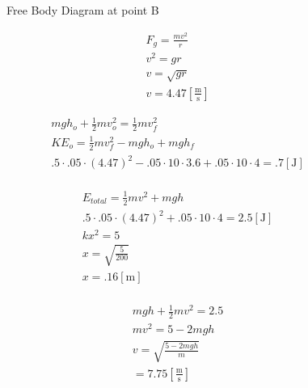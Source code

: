 \documentclass[12pt]{article}
\begin{document}
    \begin{figure}[h]
      \centering
      
      \caption{Free Body Diagram at point B}
      \label{fig:1}
    \end{figure}

    \begin{equation}
      \begin{split}
        F_g=\frac{mv^2}{r}\\
        v^2=gr\\
        v=\sqrt{gr}\\
        v=4.47\left[ \frac{\si{\meter}}{\si{\second}} \right]
      \end{split}
      \label{5}
    \end{equation}

    \begin{equation}
      \begin{split}
        mgh_o+\frac{1}{2}mv^2_o=\frac{1}{2}mv^2_f\\
        KE_o=\frac{1}{2}mv^2_f-mgh_o+mgh_f\\
      .5\cdot.05\cdot(4.47)^2-.05\cdot10\cdot3.6+.05\cdot10\cdot4=.7[\si{\joule}]\\
      \end{split}
      \label{6}
    \end{equation}

    \begin{equation}
      \begin{split}
        E_{total}=\frac{1}{2}mv^2+mgh\\
        .5\cdot.05\cdot(4.47)^2+.05\cdot10\cdot4=2.5\left[  \si{\joule}\right]\\
        kx^2=5\\
        x=\sqrt{\frac{5}{200}}\\
        x=.16\left[ \si{\meter} \right]\\
      \end{split}
      \label{7}
    \end{equation}

    \begin{equation}
      \begin{split}
        mgh+\frac{1}{2}mv^2=2.5\\
        mv^2=5-2mgh\\
        v=\sqrt{\frac{5-2mgh}{m}}\\
        =7.75\left[ \frac{\si{\meter}}{\si{\second}} \right]
      \end{split}
      \label{8}
    \end{equation}
\end{document}
